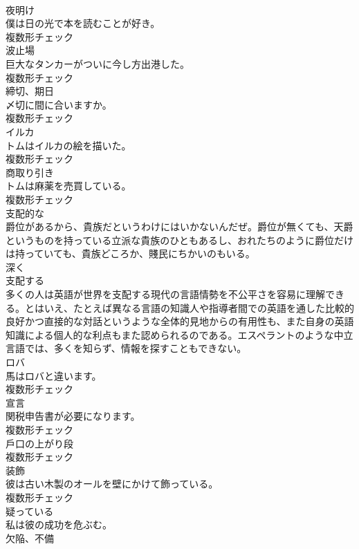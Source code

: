 \documentclass[8pt]{extreport}
\begin{document}
\begin{CJK}{UTF8}{min}
\\	[名詞]	夜明け	
\\	僕は日の光で本を読むことが好き。	
\\	複数形チェック
\\	[名詞]	波止場	
\\	巨大なタンカーがついに今し方出港した。	
\\	複数形チェック
\\	[名詞]	締切、期日	
\\	〆切に間に合いますか。	
\\	複数形チェック
\\	[名詞]	イルカ	
\\	トムはイルカの絵を描いた。	
\\	複数形チェック
\\	[名詞]	商取り引き	
\\	トムは麻薬を売買している。	
\\	複数形チェック
\\	[形容詞]	支配的な	
\\	爵位があるから、貴族だというわけにはいかないんだぜ。爵位が無くても、天爵というものを持っている立派な貴族のひともあるし、おれたちのように爵位だけは持っていても、貴族どころか、賤民にちかいのもいる。	
\\	[副詞]	深く	
\\	[動詞]	支配する	
\\	多くの人は英語が世界を支配する現代の言語情勢を不公平さを容易に理解できる。とはいえ、たとえば異なる言語の知識人や指導者間での英語を通した比較的良好かつ直接的な対話というような全体的見地からの有用性も、また自身の英語知識による個人的な利点もまた認められるのである。エスペラントのような中立言語では、多くを知らず、情報を探すこともできない。	
\\	[名詞]	ロバ	
\\	馬はロバと違います。	
\\	複数形チェック
\\	[名詞]	宣言	
\\	関税申告書が必要になります。	
\\	複数形チェック
\\	[名詞]	戶口の上がり段	
\\	複数形チェック
\\	[名詞]	装飾	
\\	彼は古い木製のオールを壁にかけて飾っている。	
\\	複数形チェック
\\	[形容詞]	疑っている	
\\	私は彼の成功を危ぶむ。	
\\	[名詞]	欠陥、不備	

\end{CJK}
\end{document}
